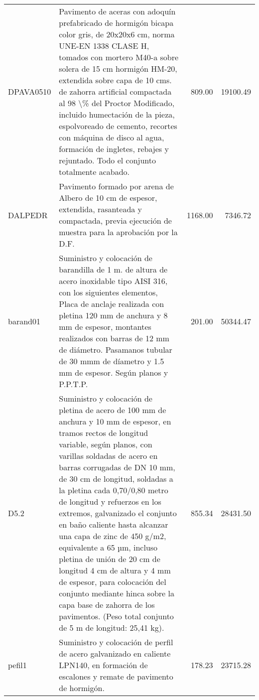 \documentclass{article}%
\begin{document}
\begin{longtable}{|l|p{4cm}|r|r|}
DPAVA0510&Pavimento de aceras con adoquín prefabricado de hormigón bicapa color gris, de 20x20x6 cm, norma UNE{-}EN 1338 CLASE H, tomados con mortero M40{-}a sobre solera de 15 cm hormigón HM{-}20, extendida sobre capa de 10 cms. de zahorra artificial compactada al 98 \textbackslash{}\% del Proctor Modificado, incluido humectación de la pieza, espolvoreado de cemento, recortes con máquina de disco al agua, formación de ingletes, rebajes y rejuntado. Todo el conjunto totalmente acabado.&809.00&19100.49\\%
DALPEDR&Pavimento formado por arena de Albero de 10 cm de espesor, extendida, rasanteada y compactada, previa ejecución de muestra para la aprobación por la D.F.&1168.00&7346.72\\%
barand01&Suministro y colocación de barandilla de 1 m. de altura de acero inoxidable tipo AISI 316, con los siguientes elementos, Placa de anclaje realizada con pletina 120 mm de anchura  y 8 mm de espesor, montantes realizados con barras de 12 mm de diámetro. Pasamanos tubular de 30 mmm de díametro y 1.5 mm de espesor. Según planos y P.P.T.P.&201.00&50344.47\\%
D5.2&Suministro y colocación de pletina de acero de 100 mm de anchura y 10 mm de espesor, en tramos rectos de longitud variable, según planos, con varillas soldadas de acero en barras corrugadas de DN 10 mm, de 30 cm de longitud, soldadas a la pletina cada 0,70/0,80 metro de longitud y refuerzos en los extremos, galvanizado el conjunto en baño caliente hasta alcanzar una capa de zinc de 450 g/m2, equivalente a 65 µm, incluso pletina de unión de 20 cm de longitud 4 cm de altura y 4 mm de espesor, para colocación del conjunto mediante hinca sobre la capa base de zahorra de los pavimentos. (Peso total conjunto de 5 m de longitud: 25,41 kg).&855.34&28431.50\\%
pefil1&Suministro y colocación de perfil de acero galvanizado en caliente LPN140, en formación de escalones y remate de pavimento de hormigón.&178.23&23715.28\\%
\end{longtable}%
\end{document}
